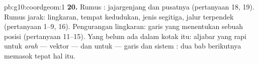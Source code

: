 \begin{solution}{pb:g10:coordgeom:1}
\textbf{20.} Rumus : jajargenjang dan pusatnya
(pertanyaan 18, 19). Rumus jarak: lingkaran, tempat kedudukan, jenis
segitiga, jalur terpendek (pertanyaan 1--9, 16). Pengurangan
 lingkaran: garis yang menentukan sebuah posisi (pertanyaan
11--15). Yang belum ada dalam kotak itu: aljabar yang rapi untuk
\emph{arah} --- vektor --- dan untuk \emph{} ---
 garis dan sistem : dua bab berikutnya memasok
tepat hal itu.

\end{solution}

